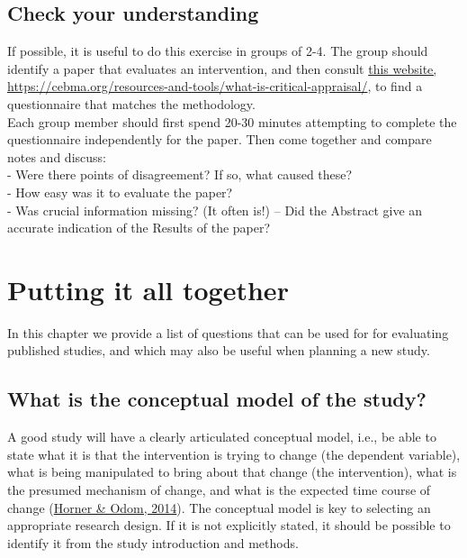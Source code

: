 \documentclass{krantz}
\begin{document}
\hypertarget{check-your-understanding-22}{%
\section{Check your understanding}\label{check-your-understanding-22}}

If possible, it is useful to do this exercise in groups of 2-4. The group should identify a paper that evaluates an intervention, and then consult \href{https://cebma.org/resources-and-tools/what-is-critical-appraisal/}{this website, https://cebma.org/resources-and-tools/what-is-critical-appraisal/}, to find a questionnaire that matches the methodology.\\
Each group member should first spend 20-30 minutes attempting to complete the questionnaire independently for the paper. Then come together and compare notes and discuss:\\
- Were there points of disagreement? If so, what caused these?\\
- How easy was it to evaluate the paper?\\
- Was crucial information missing? (It often is!) -- Did the Abstract give an accurate indication of the Results of the paper?

\hypertarget{final}{%
\chapter{Putting it all together}\label{final}}

In this chapter we provide a list of questions that can be used for for evaluating published studies, and which may also be useful when planning a new study.

\hypertarget{what-is-the-conceptual-model-of-the-study}{%
\section{What is the conceptual model of the study?}\label{what-is-the-conceptual-model-of-the-study}}

A good study will have a clearly articulated conceptual model, i.e., be able to state what it is that the intervention is trying to change (the dependent variable), what is being manipulated to bring about that change (the intervention), what is the presumed mechanism of change, and what is the expected time course of change (\protect\hyperlink{ref-horner2014}{Horner \& Odom, 2014}). The conceptual model is key to selecting an appropriate research design. If it is not explicitly stated, it should be possible to identify it from the study introduction and methods. 
\end{document}
